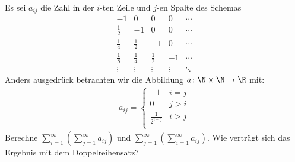 \begin{prob}
  Es sei $a_{ij}$ die Zahl in der $i$-ten Zeile und $j$-en Spalte des Schemas
  \begin{equation*}
    \begin{matrix}
      -1          & 0           & 0           & 0      & \cdots \\[3pt]
      \frac{1}{2} & -1          & 0           & 0      & \cdots \\[3pt]
      \frac{1}{4} & \frac{1}{2} & -1          & 0      & \cdots \\[3pt]
      \frac{1}{8} & \frac{1}{4} & \frac{1}{2} & -1     & \cdots \\
      \vdots      & \vdots      & \vdots      & \vdots & \ddots
    \end{matrix}
  \end{equation*}
  Anders ausgedrück betrachten wir die Abbildung $a \colon \N \times \N \to \R$
  mit:
  \begin{align*}
    a_{ij}
    =
    \begin{cases}
      -1                 & i = j \\
      0                  & j > i \\
     \frac{1}{2^{i - j}} & i > j \\
    \end{cases}
  \end{align*}
  Berechne $\sum_{i=1}^\infty (\sum_{j=1}^{\infty} a_{ij})$ und
  $\sum_{j=1}^{\infty} (\sum_{i=1}^\infty a_{ij})$. Wie verträgt sich das
  Ergebnis mit dem Doppelreihensatz?
\end{prob}

